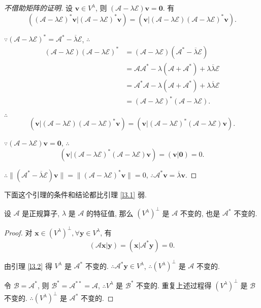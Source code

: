 \documentclass{ctexart}
\begin{document}
\begin{proof}[不借助矩阵的证明]
    设 $\boldsymbol{v}\in V^\lambda$, 则 $(\mathcal{A}-\lambda\mathcal{E})\boldsymbol{v}=\boldsymbol{0}$. 有
    \[((\mathcal{A}-\lambda\mathcal{E})^*\boldsymbol{v}|(\mathcal{A}-\lambda\mathcal{E})^*\boldsymbol{v})=(\boldsymbol{v}|(\mathcal{A}-\lambda\mathcal{E})(\mathcal{A}-\lambda\mathcal{E})^*\boldsymbol{v}).\]

    $\because(\mathcal{A}-\lambda\mathcal{E})^*=\mathcal{A}^*-\overline{\lambda}\mathcal{E}$, $\therefore$
    \begin{align*}
        (\mathcal{A}-\lambda\mathcal{E})(\mathcal{A}-\lambda\mathcal{E})^* & =(\mathcal{A}-\lambda\mathcal{E})(\mathcal{A}^*-\overline{\lambda}\mathcal{E}) \\
        & =\mathcal{AA}^*-\lambda(\mathcal{A}+\mathcal{A}^*)+\lambda\overline{\lambda}\mathcal{E} \\
        & =\mathcal{A}^*\mathcal{A}-\lambda(\mathcal{A}+\mathcal{A}^*)+\lambda\overline{\lambda}\mathcal{E} \\
        & =(\mathcal{A}-\lambda\mathcal{E})^*(\mathcal{A}-\lambda\mathcal{E}).
    \end{align*}

    $\therefore$
    \[(\boldsymbol{v}|(\mathcal{A}-\lambda\mathcal{E})(\mathcal{A}-\lambda\mathcal{E})^*\boldsymbol{v})=(\boldsymbol{v}|(\mathcal{A}-\lambda\mathcal{E})^*(\mathcal{A}-\lambda\mathcal{E})\boldsymbol{v}).\]

    $\because(\mathcal{A}-\lambda\mathcal{E})\boldsymbol{v}=\boldsymbol{0}$, $\therefore$
    \[(\boldsymbol{v}|(\mathcal{A}-\lambda\mathcal{E})^*(\mathcal{A}-\lambda\mathcal{E})\boldsymbol{v})=(\boldsymbol{v}|\boldsymbol{0})=0.\]

    $\therefore\|(\mathcal{A}^*-\overline{\lambda}\mathcal{E})\boldsymbol{v}\|=\|(\mathcal{A}-\lambda\mathcal{E})^*\boldsymbol{v}\|=0$, $\therefore\mathcal{A}^*\boldsymbol{v}=\overline{\lambda}\boldsymbol{v}$.
\end{proof}
下面这个引理的条件和结论都比引理 \ref{l3.1} 弱.
\begin{lemma}\label{l3.3}
    设 $\mathcal{A}$ 是正规算子, $\lambda$ 是 $\mathcal{A}$ 的特征值, 那么 $(V^\lambda)^\perp$ 是 $\mathcal{A}$ 不变的, 也是 $\mathcal{A}^*$ 不变的.
\end{lemma}
\begin{proof}
    对 $\boldsymbol{x}\in(V^\lambda)^\perp,\forall\boldsymbol{y}\in V^\lambda$, 有
    \[(\mathcal{A}\boldsymbol{x}|\boldsymbol{y})=(\boldsymbol{x}|\mathcal{A}^*\boldsymbol{y})=0.\]
    
    由引理 \ref{l3.2} 得 $V^\lambda$ 是 $\mathcal{A}^*$ 不变的. $\therefore\mathcal{A}^*\boldsymbol{y}\in V^\lambda$, $\therefore(V^\lambda)^\perp$ 是 $\mathcal{A}$ 不变的.

    令 $\mathcal{B}=\mathcal{A}^*$, 则 $\mathcal{B}^*=\mathcal{A}^{**}=\mathcal{A}$, $\therefore V^\lambda$ 是 $\mathcal{B}^*$ 不变的. 重复上述过程得 $(V^\lambda)^\perp$ 是 $\mathcal{B}$ 不变的. $\therefore(V^\lambda)^\perp$ 是 $\mathcal{A}^*$ 不变的.
\end{proof}
\end{document}
